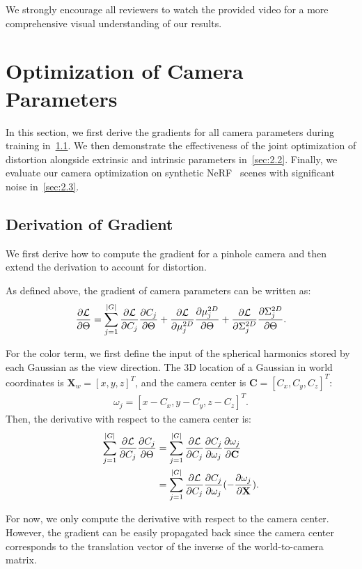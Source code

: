 We strongly encourage all reviewers to watch the provided video for a more comprehensive visual understanding of our results.


\section{Optimization of Camera Parameters}
In this section, we first derive the gradients for all camera parameters during training in~\cref{sec:2.1}. We then demonstrate the effectiveness of the joint optimization of distortion alongside extrinsic and intrinsic parameters in~\cref{sec:2.2}. Finally, we evaluate our camera optimization on synthetic NeRF~\cite{mildenhall2021nerf} scenes with significant noise in~\cref{sec:2.3}.

\subsection{Derivation of Gradient}
\label{sec:2.1}
We first derive how to compute the gradient for a pinhole camera and then extend the derivation to account for distortion.

As defined above, the gradient of camera parameters can be written as:
\begin{align}
\label{eq:simpify-grad}
\frac{\partial \mathcal{L}}{\partial \Theta} = \sum_{j=1}^{|G|} \frac{\partial \mathcal{L}}{\partial C_j}\frac{\partial C_j}{\partial \Theta} + \frac{\partial \mathcal{L}}{\partial \mu^{2D}_j}\frac{\partial \mu^{2D}_j}{\partial \Theta} + \frac{\partial \mathcal{L}}{\partial \Sigma^{2D}_j}\frac{\partial \Sigma^{2D}_j}{\partial \Theta}.
\end{align}

For the color term, we first define the input of the spherical harmonics stored by each Gaussian as the view direction. The 3D location of a Gaussian in world coordinates is $\textbf{X}_w=[x, y, z]^T$, and the camera center is $\textbf{C}=[C_x, C_y, C_z]^T$:
\begin{align}
    \omega_j = [x - C_x, y - C_y, z - C_z]^T.
\end{align}
Then, the derivative with respect to the camera center is:
\begin{align}
    \sum_{j=1}^{|G|} \frac{\partial \mathcal{L}}{\partial C_j}\frac{\partial C_j}{\partial \Theta}&=\sum_{j=1}^{|G|} \frac{\partial \mathcal{L}}{\partial C_j}\frac{\partial C_j}{\partial \omega_j}\frac{\partial \omega_j}{\partial \textbf{C}}\\
    &=\sum_{j=1}^{|G|} \frac{\partial \mathcal{L}}{\partial C_j}\frac{\partial C_j}{\partial \omega_j}(-\frac{\partial \omega_j}{\partial \textbf{X}}).
\end{align}

For now, we only compute the derivative with respect to the camera center. However, the gradient can be easily propagated back since the camera center corresponds to the translation vector of the inverse of the world-to-camera matrix.

